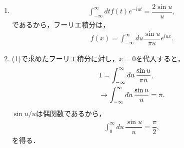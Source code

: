 \begin{enumerate}[(1)]
  \item
	\begin{align}
	  \int_{-\infty}^{\infty}dt f(t)e^{-iut} = \dfrac{2\sin u}{u},
	\end{align}
      であるから，フーリエ積分は，
       \begin{align}
	 f(x) = \int_{-\infty}^{\infty}du\dfrac{\sin u}{\pi u}e^{iux}. 
       \end{align}
  \item (1)で求めたフーリエ積分に対し，$x=0$を代入すると，
	\begin{align}
	  & 1 = \int_{-\infty}^{\infty}du\, \dfrac{\sin u}{\pi u}, \notag \\
          &\rightarrow \int_{-\infty}^{\infty}du\, \dfrac{\sin u}{ u} = \pi.
	\end{align}
	$\sin u/u$は偶関数であるから，
	\begin{align}
	 \int_{0}^{\infty}du\, \dfrac{\sin u}{ u} = \dfrac{\pi}{2}, 
	\end{align}
	を得る．
\end{enumerate}
%
